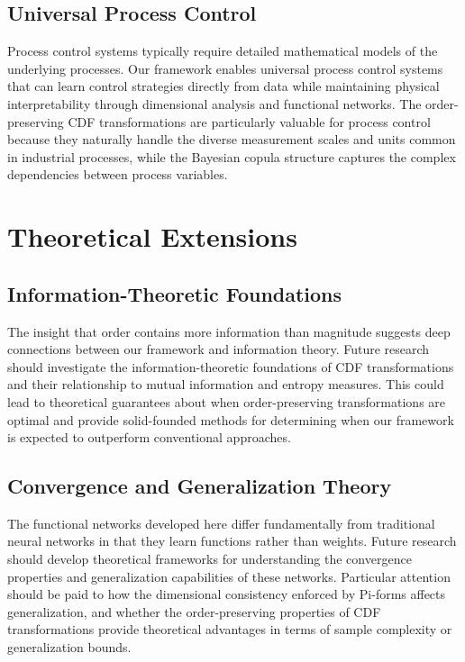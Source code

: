 \subsection{Universal Process Control}
Process control systems typically require detailed mathematical models of the underlying processes. Our framework enables universal process control systems that can learn control strategies directly from data while maintaining physical interpretability through dimensional analysis and functional networks.
The order-preserving CDF transformations are particularly valuable for process control because they naturally handle the diverse measurement scales and units common in industrial processes, while the Bayesian copula structure captures the complex dependencies between process variables.

\section{Theoretical Extensions}
\subsection{Information-Theoretic Foundations}
The insight that order contains more information than magnitude suggests deep connections between our framework and information theory. Future research should investigate the information-theoretic foundations of CDF transformations and their relationship to mutual information and entropy measures.
This could lead to theoretical guarantees about when order-preserving transformations are optimal and provide solid-founded methods for determining when our framework is expected to outperform conventional approaches.

\subsection{Convergence and Generalization Theory}
The functional networks developed here differ fundamentally from traditional neural networks in that they learn functions rather than weights. Future research should develop theoretical frameworks for understanding the convergence properties and generalization capabilities of these networks.
Particular attention should be paid to how the dimensional consistency enforced by Pi-forms affects generalization, and whether the order-preserving properties of CDF transformations provide theoretical advantages in terms of sample complexity or generalization bounds.

